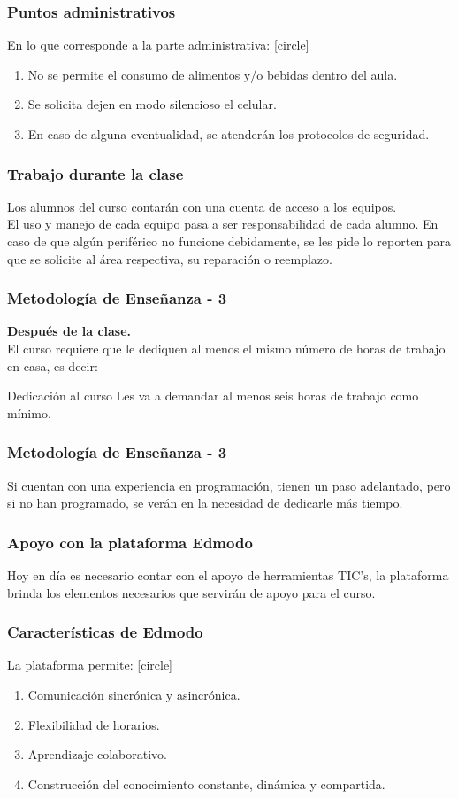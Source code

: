 \documentclass[12pt]{beamer}
\begin{document}
\begin{frame}
\frametitle{Puntos administrativos}
En lo que corresponde a la parte administrativa:
[circle]
\begin{enumerate}[<+->]
\item No se permite el consumo de alimentos y/o bebidas dentro del aula.
\item Se solicita dejen en modo silencioso el celular.
\item En caso de alguna eventualidad, se atenderán los protocolos de seguridad.
\end{enumerate}
\end{frame}
\begin{frame}
\frametitle{Trabajo durante la clase}
Los alumnos del curso contarán con una cuenta de acceso a los equipos.
\\
\bigskip
\pause
El uso y manejo de cada equipo pasa a ser responsabilidad de cada alumno. En caso de que algún periférico no funcione debidamente, se les pide lo reporten para que se solicite al área respectiva, su reparación o reemplazo.
\end{frame}
\begin{frame}
\frametitle{Metodología de Enseñanza - 3}
\textbf{Después de la clase.}
\\
\medskip
El curso \alert{requiere que le dediquen al menos el mismo número de horas de trabajo en casa}, es decir:
\pause
\begin{exampleblock}{Dedicación al curso}
Les va a demandar al menos seis horas de trabajo como mínimo.
\end{exampleblock}
\end{frame}
\begin{frame}
\frametitle{Metodología de Enseñanza - 3}
Si cuentan con una experiencia en programación, tienen un paso adelantado, pero si no han programado, se verán en la necesidad de dedicarle más tiempo.
\end{frame}
\begin{frame}
\frametitle{Apoyo con la plataforma Edmodo}
Hoy en día es necesario contar con el apoyo de herramientas TIC's, la plataforma  brinda los elementos necesarios que servirán de apoyo para el curso.
\end{frame}
\begin{frame}
\frametitle{Características de Edmodo}
La plataforma permite:
[circle]
\begin{enumerate}[<+->]
\item Comunicación sincrónica y asincrónica.
\item Flexibilidad de horarios.
\item Aprendizaje colaborativo.
\item Construcción del conocimiento constante, dinámica y compartida.
\end{enumerate}
\end{frame}
\end{document}
